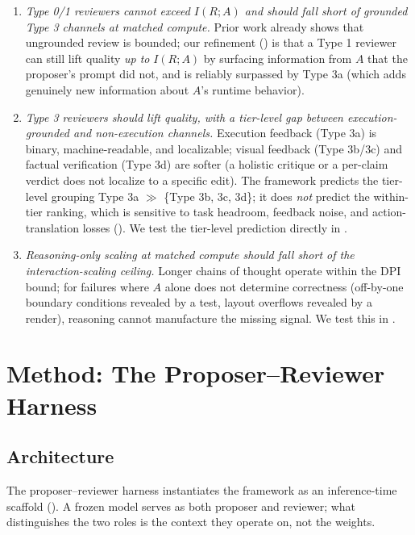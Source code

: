 \documentclass[11pt]{article}
\begin{document}
\begin{enumerate}[leftmargin=*,topsep=0.2ex,itemsep=0.4ex]
\item \textit{Type 0/1 reviewers cannot exceed $I(R; A)$ and should fall short of grounded Type 3 channels at matched compute.} Prior work \citep{huang2024selfcorrect,trankiela2026singleagent} already shows that ungrounded review is bounded; our refinement () is that a Type 1 reviewer can still lift quality \emph{up to} $I(R; A)$ by surfacing information from $A$ that the proposer's prompt did not, and is reliably surpassed by Type 3a (which adds genuinely new information about $A$'s runtime behavior).
\item \textit{Type 3 reviewers should lift quality, with a tier-level gap between execution-grounded and non-execution channels.} Execution feedback (Type 3a) is binary, machine-readable, and localizable; visual feedback (Type 3b/3c) and factual verification (Type 3d) are softer (a holistic critique or a per-claim verdict does not localize to a specific edit). The framework predicts the tier-level grouping Type 3a $\gg$ \{Type 3b, 3c, 3d\}; it does \emph{not} predict the within-tier ranking, which is sensitive to task headroom, feedback noise, and action-translation losses (). We test the tier-level prediction directly in .
\item \textit{Reasoning-only scaling at matched compute should fall short of the interaction-scaling ceiling.} Longer chains of thought operate within the DPI bound; for failures where $A$ alone does not determine correctness (off-by-one boundary conditions revealed by a test, layout overflows revealed by a render), reasoning cannot manufacture the missing signal. We test this in .
\end{enumerate}

\section{Method: The Proposer--Reviewer Harness}
\label{sec:method}

\subsection{Architecture}

The proposer--reviewer harness instantiates the framework as an inference-time scaffold (). A frozen model serves as both proposer and reviewer; what distinguishes the two roles is the context they operate on, not the weights.
\end{document}
